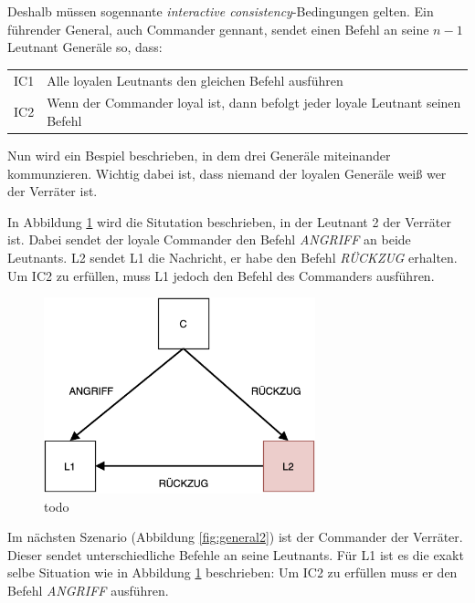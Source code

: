 \documentclass{article}
\begin{document}
\medskip 

Deshalb müssen sogennante \textit{interactive consistency}-Bedingungen gelten.
Ein führender General, auch Commander gennant, sendet einen Befehl an seine $n - 1$ Leutnant 
Generäle so, dass:

\smallskip 

\begin{tabular}{l l}
IC1 & Alle loyalen Leutnants den gleichen Befehl ausführen \\
IC2 & Wenn der Commander loyal ist, dann befolgt jeder loyale Leutnant seinen Befehl
\end{tabular}

\medskip
Nun wird ein Bespiel beschrieben, in dem drei Generäle miteinander kommunzieren. 
Wichtig dabei ist, dass niemand der loyalen Generäle weiß wer der Verräter ist.

In Abbildung \ref{fig:general1} wird die Situtation beschrieben, 
in der Leutnant 2 der Verräter ist. Dabei sendet der loyale Commander
den Befehl \textit{ANGRIFF} an beide Leutnants. L2 sendet L1 die Nachricht,
er habe den Befehl \textit{RÜCKZUG} erhalten. Um IC2 zu erfüllen, muss L1 jedoch
den Befehl des Commanders ausführen. 

\medskip 

\begin{figure}[H]
    \centering
    \includegraphics[width=0.7\textwidth]{general1.png}
    \caption{todo}
    \label{fig:general1}
\end{figure}

\medskip

Im nächsten Szenario (Abbildung \ref{fig:general2}) ist der Commander der Verräter. Dieser sendet unterschiedliche 
Befehle an seine Leutnants. Für L1 ist es die exakt selbe Situation 
wie in Abbildung \ref{fig:general1} beschrieben: Um IC2 zu erfüllen muss er den Befehl
\textit{ANGRIFF} ausführen. 
\end{document}
